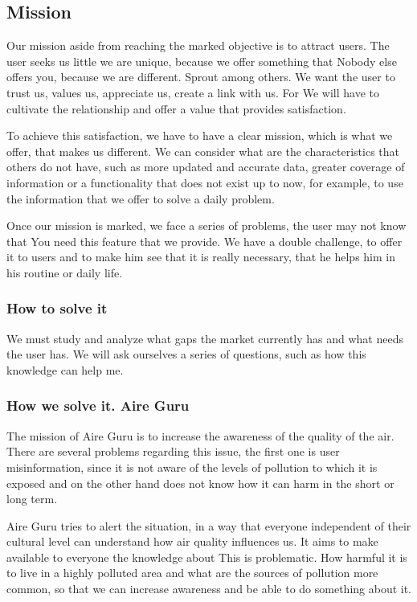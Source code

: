\subsection{Mission}
Our mission aside from reaching the marked objective is to attract users.
The user seeks us little we are unique, because we offer something that
Nobody else offers you, because we are different. Sprout among others.
We want the user to trust us, values us, appreciate us, create a link with us. For
We will have to cultivate the relationship and offer a value that provides satisfaction.

To achieve this satisfaction, we have to have a clear mission, which is what we offer, that makes us different.
We can consider what are the characteristics that others do not have, such as more updated and accurate data,
greater coverage of information or a functionality that does not exist up to now, for example, to use the
information that we offer to solve a daily problem.

Once our mission is marked, we face a series of problems, the user may not know that
You need this feature that we provide. We have a double challenge, to offer it to users and
to make him see that it is really necessary, that he helps him in his routine or daily life.

\subsubsection{How to solve it} 
We must study and analyze what gaps the market currently has and what needs the user has.
We will ask ourselves a series of questions, such as how this knowledge can help me.

\subsubsection{How we solve it. Aire Guru} 
The mission of Aire Guru is to increase the awareness of the quality of the air.
There are several problems regarding this issue, the first one is user misinformation, since it is not
aware of the levels of pollution to which it is exposed and on the other hand does not know how it can harm
in the short or long term.

Aire Guru tries to alert the situation, in a way that everyone independent of their cultural level
can understand how air quality influences us. It aims to make available to everyone the knowledge about
This is problematic. How harmful it is to live in a highly polluted area and what are the sources of pollution
more common, so that we can increase awareness and be able to do something about it.


